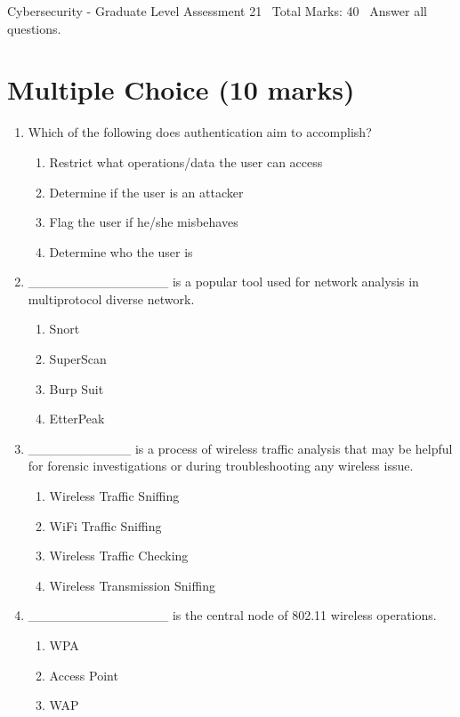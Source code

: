 \documentclass[12pt]{article}
\begin{document}
\begin{center}
Cybersecurity - Graduate Level Assessment 21 \
Total Marks: 40 \
Answer all questions.
\end{center}

\section*{Multiple Choice (10 marks)}
\begin{enumerate}[label=\arabic*.]
\item Which of the following does authentication aim to accomplish?
\begin{enumerate}[label=(\alph*)]
    \item Restrict what operations/data the user can access
    \item Determine if the user is an attacker
    \item Flag the user if he/she misbehaves
    \item Determine who the user is
\end{enumerate}
\item \_\_\_\_\_\_\_\_\_\_\_\_\_\_\_ is a popular tool used for network analysis in multiprotocol diverse network.
\begin{enumerate}[label=(\alph*)]
    \item Snort
    \item SuperScan
    \item Burp Suit
    \item EtterPeak
\end{enumerate}
\item \_\_\_\_\_\_\_\_\_\_\_ is a process of wireless traffic analysis that may be helpful for forensic investigations or during troubleshooting any wireless issue.
\begin{enumerate}[label=(\alph*)]
    \item Wireless Traffic Sniffing
    \item WiFi Traffic Sniffing
    \item Wireless Traffic Checking
    \item Wireless Transmission Sniffing
\end{enumerate}
\item \_\_\_\_\_\_\_\_\_\_\_\_\_\_\_ is the central node of 802.11 wireless operations.
\begin{enumerate}[label=(\alph*)]
    \item WPA
    \item Access Point
    \item WAP

\end{enumerate}
\end{enumerate}
\end{document}
